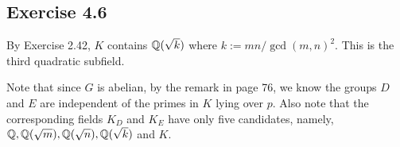 \documentclass[../Marcus.tex]{subfiles}
\begin{document}
\begin{comment}
It's remaining to show that $H$ is normal in $G$. Note that for each $\sigma\in G$, $\sigma H\sigma^{-1}$ forms another subgroup with $\#(\sigma H\sigma^{-1})=\#(H)$. And by the uniqueness, we have $\sigma H\sigma^{-1}=H$. This means $H$ is normal in $G$.

Let's show the groups have the desired properties. If there are distinct prime divisors $p,q$ of $\#(G)$, then by Cauchy's theorem, $\exists \sigma,\tau\in G$ with order $p,q$, respectively. Since $H$ is the smallest subgroup, $H\subseteq \langle\sigma\rangle,\langle\tau\rangle$. This implies $\#(H)\mid p,q$ and so $\#(H)=1$, which is absurd. So $\#(G)$ is a prime power. Consequently, $H$ must have prime order. Lastly, $H\subset Z(G)$ is clear.

(e) Similar to (d), we assume there's at least one intermediate field $K'$. And let $K'$ be the compositum of all intermediate fields, $H$ be the corresponding subgroup in $G$. Since this time $P$ splits completely in every intermediate field. By Theorem 31 again, $P$ splits completely in $K'$. Thus we have $K'\varsubsetneq L$. The remaining arguments are exactly the same in (d).

As an example, let $K=\QQ$ and $L=\QQ(e^{2\pi i/5})$. We know $G=(\ZZ/5\ZZ)^\times\simeq C_4$, the cyclic group of order $4$. There's only one subgroup in $C_4$, namely, $\{0,2\}$. So by Galois correspondence, there's only one intermediate field. Moreover, by Exercise 2.8, we know this field is $\QQ(\sqrt{5})$. Note that the corresponding subgroup $H$ is isomorphic to $\{0,2\}$, which clearly has the desired properties.

Consider $p=11$. Since $5$ is a square mod $11$, by Theorem 25 (p. 52), we have $11$ splits completely in $\QQ(\sqrt{5})$. Moreover, by Theorem 26 (p. 53), $f$ is the order of $11$ in $(\ZZ/5\ZZ)^\times$, which is $2$. So $11$ does not split completely in $L=\QQ(e^{2\pi i/5})$.
\end{comment}

\subsection*{Exercise 4.6}

By Exercise 2.42, $K$ contains $\mathbb{Q}(\sqrt{k})$ where $k:=mn/\gcd(m,n)^2$. This is the third quadratic subfield.

Note that since $G$ is abelian, by the remark in page 76, we know the groups $D$ and $E$ are independent of the primes in $K$ lying over $p$. Also note that the corresponding fields $K_D$ and $K_E$ have only five candidates, namely, $\mathbb{Q},\mathbb{Q}(\sqrt{m}),\mathbb{Q}(\sqrt{n}),\mathbb{Q}(\sqrt{k})$ and $K$.
\end{document}
